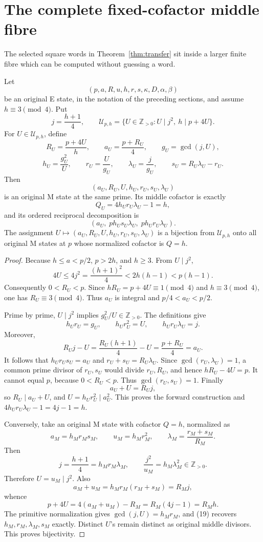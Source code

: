 \section{The complete fixed-cofactor middle fibre}

The selected square words in Theorem~\ref{thm:transfer} sit inside a larger
finite fibre which can be computed without guessing a word.

\begin{theorem}\label{thm:fixed-Q}
Let
\[
 (p,a,R,u,h,r,s,\kappa,D,\alpha,\beta)
\]
be an original E state, in the notation of the preceding sections, and assume
\(h\equiv3\pmod4\).  Put
\[
 j=\frac{h+1}{4},\qquad
 \mathcal U_{p,h}
 =\{U\in\mathbb Z_{>0}:U\mid j^2,\ h\mid p+4U\}.
\]
For \(U\in\mathcal U_{p,h}\), define
\[
 R_U=\frac{p+4U}{h},\qquad
 a_U=\frac{p+R_U}{4},\qquad
 g_U=\gcd(j,U),
\]
\[
 h_U=\frac{g_U^2}{U},\qquad
 r_U=\frac{U}{g_U},\qquad
 \lambda_U=\frac{j}{g_U},\qquad
 s_U=R_U\lambda_U-r_U.                                 \tag{19}
\]
Then
\[
 \boxed{(a_U,R_U,U,h_U,r_U,s_U,\lambda_U)}
\]
is an original M state at the same prime.  Its middle cofactor is exactly
\[
 Q_U=4h_Ur_U\lambda_U-1=h,
\]
and its ordered reciprocal decomposition is
\[
 \boxed{
 \left(a_U,\;p h_Us_U\lambda_U,\;p h_Ur_U\lambda_U\right).} \tag{20}
\]
The assignment \(U\mapsto(a_U,R_U,U,h_U,r_U,s_U,\lambda_U)\) is a
bijection from \(\mathcal U_{p,h}\) onto all original M states at \(p\)
whose normalized cofactor is \(Q=h\).
\end{theorem}

\begin{proof}
Because \(h\le a<p/2\), \(p>2h\), and \(h\ge3\).  From \(U\mid j^2\),
\[
 4U\le4j^2=\frac{(h+1)^2}{4}<2h(h-1)<p(h-1).
\]
Consequently \(0<R_U<p\).  Since
\(hR_U=p+4U\equiv1\pmod4\) and \(h\equiv3\pmod4\), one has
\(R_U\equiv3\pmod4\).  Thus \(a_U\) is integral and
\(p/4<a_U<p/2\).

Prime by prime, \(U\mid j^2\) implies \(g_U^2/U\in\mathbb Z_{>0}\).
The definitions give
\[
 h_Ur_U=g_U,\qquad h_Ur_U^2=U,\qquad
 h_Ur_U\lambda_U=j.
\]
Moreover,
\[
 R_Uj-U=\frac{R_U(h+1)}4-U
 =\frac{p+R_U}{4}=a_U.
\]
It follows that \(h_Ur_Us_U=a_U\) and
\(r_U+s_U=R_U\lambda_U\).  Since
\(\gcd(r_U,\lambda_U)=1\), a common prime divisor of \(r_U,s_U\) would
divide \(r_U,R_U\), and hence \(hR_U-4U=p\).  It cannot equal \(p\), because
\(0<R_U<p\).  Thus \(\gcd(r_U,s_U)=1\).  Finally
\[
 a_U+U=R_Uj,
\]
so \(R_U\mid a_U+U\), and \(U=h_Ur_U^2\mid a_U^2\).  This proves the
forward construction and \(4h_Ur_U\lambda_U-1=4j-1=h\).

Conversely, take an original M state with cofactor \(Q=h\), normalized as
\[
 a_M=h_Mr_Ms_M,\qquad u_M=h_Mr_M^2,\qquad
 \lambda_M=\frac{r_M+s_M}{R_M}.
\]
Then
\[
 j=\frac{h+1}{4}=h_Mr_M\lambda_M,\qquad
 \frac{j^2}{u_M}=h_M\lambda_M^2\in\mathbb Z_{>0}.
\]
Therefore \(U=u_M\mid j^2\).  Also
\[
 a_M+u_M=h_Mr_M(r_M+s_M)=R_Mj,
\]
whence
\[
 p+4U=4(a_M+u_M)-R_M=R_M(4j-1)=R_Mh.
\]
The primitive normalization gives
\(\gcd(j,U)=h_Mr_M\), and (19) recovers
\(h_M,r_M,\lambda_M,s_M\) exactly.  Distinct \(U\)'s remain distinct as
original middle divisors.  This proves bijectivity.
\end{proof}

